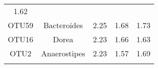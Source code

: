 \documentclass[12pt,]{article}
\begin{document}
\begin{longtable}[]{@{}ccccc@{}}
\begin{minipage}[t]{0.19\columnwidth}
1.62\strut
\end{minipage}\tabularnewline
\begin{minipage}[t]{0.07\columnwidth}\centering\strut
OTU59\strut
\end{minipage} & \begin{minipage}[t]{0.18\columnwidth}\centering\strut
Bacteroides\strut
\end{minipage} & \begin{minipage}[t]{0.17\columnwidth}\centering\strut
2.25\strut
\end{minipage} & \begin{minipage}[t]{0.25\columnwidth}\centering\strut
1.68\strut
\end{minipage} & \begin{minipage}[t]{0.19\columnwidth}\centering\strut
1.73\strut
\end{minipage}\tabularnewline
\begin{minipage}[t]{0.07\columnwidth}\centering\strut
OTU16\strut
\end{minipage} & \begin{minipage}[t]{0.18\columnwidth}\centering\strut
Dorea\strut
\end{minipage} & \begin{minipage}[t]{0.17\columnwidth}\centering\strut
2.23\strut
\end{minipage} & \begin{minipage}[t]{0.25\columnwidth}\centering\strut
1.66\strut
\end{minipage} & \begin{minipage}[t]{0.19\columnwidth}\centering\strut
1.63\strut
\end{minipage}\tabularnewline
\begin{minipage}[t]{0.07\columnwidth}\centering\strut
OTU2\strut
\end{minipage} & \begin{minipage}[t]{0.18\columnwidth}\centering\strut
Anaerostipes\strut
\end{minipage} & \begin{minipage}[t]{0.17\columnwidth}\centering\strut
2.23\strut
\end{minipage} & \begin{minipage}[t]{0.25\columnwidth}\centering\strut
1.57\strut
\end{minipage} & \begin{minipage}[t]{0.19\columnwidth}\centering\strut
1.69\strut
\end{minipage}\tabularnewline
\begin{minipage}[t]{0.07\columnwidth}\centering\strut

\end{minipage}
\end{longtable}
\end{document}
